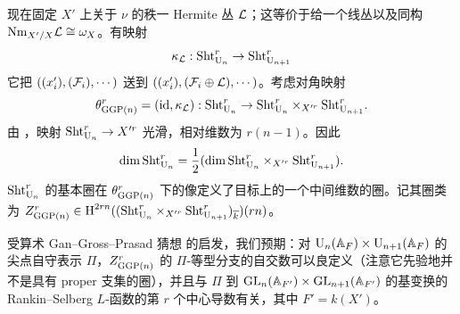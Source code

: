 \begin{exam}
现在固定 $X'$ 上关于 $\nu$ 的秩一 Hermite 丛 $\mathcal{L}$；这等价于给一个线丛以及同构 $\textup{Nm}_{X'/X}\mathcal{L}\cong \omega_{X}$。有映射
\begin{equation*}
\kappa_{\mathcal{L}}:\textup{Sht}^{r}_{\textup{U}_{n}}\to \textup{Sht}^{r}_{\textup{U}_{n+1}}
\end{equation*}
它把 $((x'_{i}), (\mathcal{F}_{i}), \cdots)$ 送到 $((x'_{i}), (\mathcal{F}_{i}\oplus\mathcal{L}),\cdots)$。考虑对角映射
\begin{equation*}
\theta^{r}_{\textup{GGP}(n)}=(\textup{id},\kappa_{\mathcal{L}}): \textup{Sht}^{r}_{\textup{U}_{n}}\to \textup{Sht}^{r}_{\textup{U}_{n}}\times_{X'^{r}}\textup{Sht}^{r}_{\textup{U}_{n+1}}.
\end{equation*}
由 \cite[Lemma 6.9(2)]{FYZ1}，映射 $\textup{Sht}^{r}_{\textup{U}_{n}}\to X'^{r}$ 光滑，相对维数为 $r(n-1)$。因此
$$\dim\textup{Sht}^{r}_{\textup{U}_{n}}=\frac{1}{2}(\dim\textup{Sht}^{r}_{\textup{U}_{n}}\times_{X'^{r}}\textup{Sht}^{r}_{\textup{U}_{n+1}}).$$
$\textup{Sht}^{r}_{\textup{U}_{n}}$ 的基本圈在 $\theta^{r}_{\textup{GGP}(n)}$ 下的像定义了目标上的一个中间维数的圈。记其圈类为 $Z^{r}_{\textup{GGP}(n)}\in \textup{H}^{2rn}({(\textup{Sht}^{r}_{\textup{U}_{n}}\times_{X'^{r}}\textup{Sht}^{r}_{\textup{U}_{n+1}})_{\overline k}})(rn)$。

受算术 Gan–Gross–Prasad 猜想 \cite{GGP} 的启发，我们预期：对 $\textup{U}_{n}(\mathbb{A}_{F})\times \textup{U}_{n+1}(\mathbb{A}_{F})$ 的尖点自守表示 $\Pi$，$Z^{r}_{\textup{GGP}(n)}$ 的 $\Pi$-等型分支的自交数可以良定义（注意它先验地并不是具有 proper 支集的圈），并且与 $\Pi$ 到 $\textup{GL}_{n}(\mathbb{A}_{F'})\times\textup{GL}_{n+1}(\mathbb{A}_{F'})$ 的基变换的 Rankin–Selberg $L$-函数的第 $r$ 个中心导数有关，其中 $F'=k(X')$。

\end{exam}

